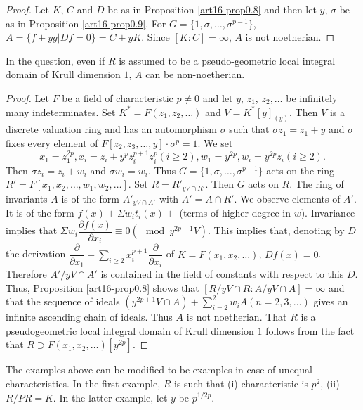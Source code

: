 \begin{proof}
Let $K$, $C$ and $D$ be as in Proposition \ref{art16-prop0.8} and then let $y$, $\sigma$ be as in Proposition \ref{art16-prop0.9}. For $G=\{1,\sigma,\ldots,\sigma^{p-1}\}$, $A=\{f+yg | Df=0\}=C+yK$. Since $[K:C]=\infty$, $A$ is not noetherian.
\end{proof}

\begin{proposition}\label{art16-prop0.11}
In the question, even if $R$ is assumed to be a pseudo-geometric local integral domain of Krull dimension $1$, $A$ can be non-noetherian.
\end{proposition}

\begin{proof}
Let $F$ be a field of characteristic $p\neq 0$ and let $y$, $z_{1}$, $z_{2},\ldots$ be infinitely many indeterminates. Set $K^{*}=F(z_{1},z_{2},\ldots)$ and $V=K^{*}[y]_{(y)}$. Then $V$ is a discrete valuation ring and has an automorphism $\sigma$ such that $\sigma z_{1}=z_{1}+y$ and $\sigma$ fixes every element of $F[z_{2},z_{3},\ldots,y]\cdot \sigma^{p}=1$. We set
$$
x_{1}=z^{2p}_{1},x_{i}=z_{i}+y^{p}z^{p+1}_{i}z^{p}_{i}(i\geq 2), w_{1}=y^{2p},w_{i}=y^{2p}z_{i}(i\geq 2).
$$\pageoriginale
Then $\sigma z_{i}=z_{i}+w_{i}$ and $\sigma w_{i}=w_{i}$. Thus $G=\{1,\sigma,\ldots,\sigma^{p-1}\}$ acts on the ring $R'=F[x_{1},x_{2},\ldots,w_{1},w_{2},\ldots]$. Set $R=R'_{y V\cap R'}$. Then $G$ acts on $R$. The ring of invariants $A$ is of the form $A'_{yV\cap A'}$ with $A'=A\cap R'$. We observe elements of $A'$. It is of the form $f(x)+\Sigma w_{i}t_{i}(x)+$ (terms of higher degree in $w$). Invariance implies that $\Sigma w_{i}\dfrac{\partial f(x)}{\partial x_{i}}\equiv 0(\mod y^{2p+1}V)$. This implies that, denoting by $D$ the derivation $\dfrac{\partial}{\partial x_{1}}+\sum\limits_{i\geq 2} x^{p+1}_{i}\dfrac{\partial}{\partial x_{i}}$ of $K=F(x_{1},x_{2},\ldots)$, $Df(x)=0$. Therefore $A'/yV\cap A'$ is contained in the field of constants with respect to this $D$. Thus, Proposition \ref{art16-prop0.8} shows that $[R/y V\cap R: A/yV\cap A]=\infty$ and that the sequence of ideals $(y^{2p+1}V\cap A)+\sum\limits^{2}_{i=2}w_{i}A(n=2,3,\ldots)$ gives an infinite ascending chain of ideals. Thus $A$ is not noetherian. That $R$ is a pseudogeometric local integral domain of Krull dimension $1$ follows from the fact that $R\supset F(x_{1},x_{2},\ldots)[y^{2p}]$.
\end{proof}

\begin{remark}\label{art16-rem0.12}
The examples above can be modified to be examples in case of unequal characteristics. In the first example, $R$ is such that (i) characteristic is $p^{2}$, (ii) $R/PR=K$. In the latter example, let $y$ be $p^{1/2p}$.
\end{remark}

